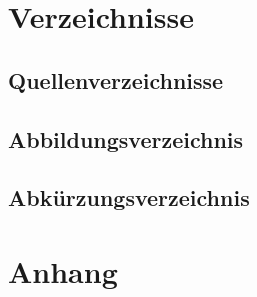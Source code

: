 \documentclass[titlepage,12pt,twoside]{article}
\begin{document}
\section{Verzeichnisse}
\subsection{Quellenverzeichnisse}

\subsection{Abbildungsverzeichnis}
\subsection{Abkürzungsverzeichnis}

\section{Anhang}


\end{document}
